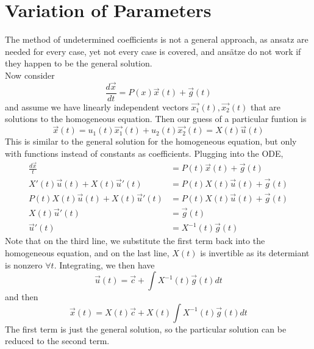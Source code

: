 \documentclass[12pt]{article}
\begin{document}
\section{Variation of Parameters}
The method of undetermined coefficients is not a general approach, as ansatz are needed for every case, yet not every case is covered, and ans\"atze do not work if they happen to be the general solution. \\
Now consider
$$\frac{d\vec{x}}{dt} = P(x)\vec{x}(t) + \vec{g}(t)$$
and assume we have linearly independent vectors $\vec{x_1}(t), \vec{x_2}(t)$ that are solutions to the homogeneous equation. Then our guess of a particular funtion is
$$\vec{x}(t) = u_1(t)\vec{x_1}(t) + u_2(t)\vec{x_2}(t) = X(t)\vec{u}(t)$$
This is similar to the general solution for the homogeneous equation, but only with functions instead of constants as coefficients. Plugging into the ODE,
\begin{align*}
	\frac{d\vec{x}}{t} &= P(t)\vec{x}(t) + \vec{g}(t) \\
	X'(t)\vec{u}(t) + X(t)\vec{u}'(t) &= P(t)X(t)\vec{u}(t) + \vec{g}(t) \\
	P(t)X(t)\vec{u}(t) + X(t)\vec{u}'(t) &= P(t)X(t)\vec{u}(t) + \vec{g}(t) \\
	X(t)\vec{u}'(t) &= \vec{g}(t) \\
	\vec{u}'(t) &= X^{-1}(t)\vec{g}(t)
\end{align*}
Note that on the third line, we substitute the first term back into the homogeneous equation, and on the last line, $X(t)$ is invertible as its determiant is nonzero $\forall t$. Integrating, we then have
$$\vec{u}(t) = \vec{c} + \int X^{-1}(t)\vec{g}(t)dt$$
and then
$$\vec{x}(t) = X(t)\vec{c} + X(t)\int X^{-1}(t)\vec{g}(t)dt$$
The first term is just the general solution, so the particular solution can be reduced to the second term.
\end{document}
